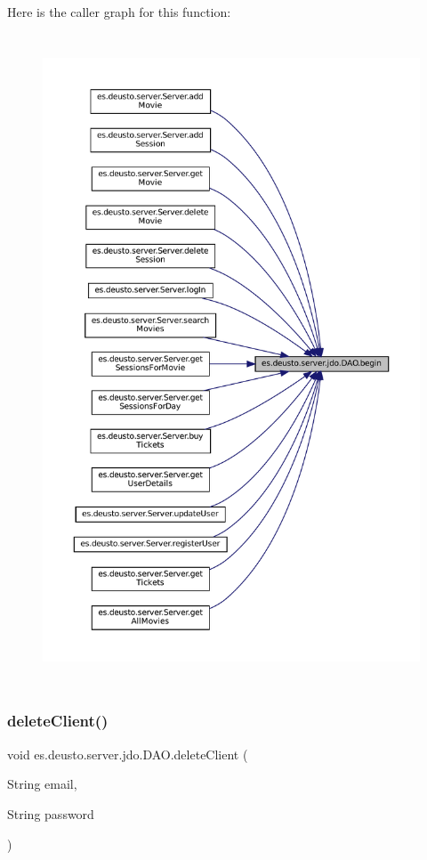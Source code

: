 Here is the caller graph for this function\+:
\nopagebreak
\begin{figure}[H]
\begin{center}
\leavevmode
\includegraphics[height=550pt]{classes_1_1deusto_1_1server_1_1jdo_1_1_d_a_o_ad923bb21c8273dabc601b85713703c89_icgraph}
\end{center}
\end{figure}
\mbox{\label{classes_1_1deusto_1_1server_1_1jdo_1_1_d_a_o_a9664ce68819a53c7b27add7f305a52b0}} 
\subsubsection{\texorpdfstring{deleteClient()}{deleteClient()}\hspace{0.1cm}{\footnotesize\ttfamily [1/2]}}
{\footnotesize\ttfamily void es.\+deusto.\+server.\+jdo.\+D\+A\+O.\+delete\+Client (\begin{DoxyParamCaption}\item[{String}]{email,  }\item[{String}]{password }\end{DoxyParamCaption})}



